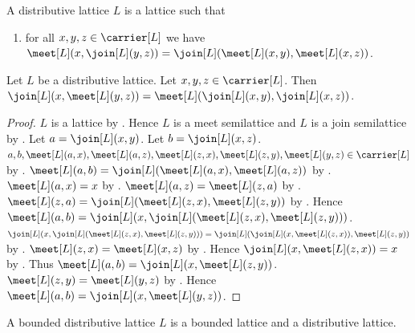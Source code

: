 \begin{struct}\label{distributive_lattice}
    A distributive lattice $L$ is a lattice such that
    \begin{enumerate}
        \item\label{meet_distributes_over_join}
            for all $x,y,z\in\carrier[L]$ we have
                $\meet[L](x,\join[L](y,z))
                    =\join[L](\meet[L](x,y),\meet[L](x,z))$.
    \end{enumerate}
\end{struct}

\begin{theorem}\label{join_distributes_over_meet}
    Let $L$ be a distributive lattice.
    Let $x,y,z\in\carrier[L]$.
    Then $\join[L](x,\meet[L](y,z))
        =\meet[L](\join[L](x,y),\join[L](x,z))$.
\end{theorem}
\begin{proof}
    $L$ is a lattice by .
    Hence $L$ is a meet semilattice and $L$ is a join semilattice by
        .
    Let $a=\join[L](x,y)$.
    Let $b=\join[L](x,z)$.
    $a,b,\meet[L](a,x),\meet[L](a,z),
        \meet[L](z,x),\meet[L](z,y),\meet[L](y,z)
        \in\carrier[L]$ by .
    $\meet[L](a,b)
        =\join[L](\meet[L](a,x),\meet[L](a,z))$ by
        .
    $\meet[L](a,x)=x$ by
        .
    $\meet[L](a,z)=\meet[L](z,a)$ by .
    $\meet[L](z,a)
        =\join[L](\meet[L](z,x),\meet[L](z,y))$ by
        .
    Hence $\meet[L](a,b)
        =\join[L]
            (x,\join[L](\meet[L](z,x),\meet[L](z,y)))$.
    $\join[L](x,\join[L](\meet[L](z,x),\meet[L](z,y)))
        =\join[L]
            (\join[L](x,\meet[L](z,x)),\meet[L](z,y))$ by
        .
    $\meet[L](z,x)=\meet[L](x,z)$ by .
    Hence $\join[L](x,\meet[L](z,x))=x$ by
        .
    Thus $\meet[L](a,b)=\join[L](x,\meet[L](z,y))$.
    $\meet[L](z,y)=\meet[L](y,z)$ by .
    Hence $\meet[L](a,b)=\join[L](x,\meet[L](y,z))$.
\end{proof}

\begin{struct}\label{bounded_distributive_lattice}
    A bounded distributive lattice $L$ is a bounded lattice and
        a distributive lattice.
\end{struct}

